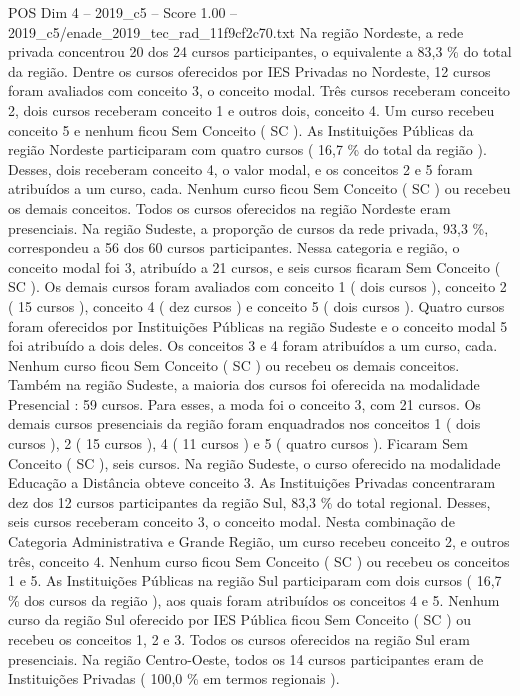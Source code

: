 \begin{textsample}{POS Dim 4 – 2019\_c5 – Score 1.00 – 2019\_c5/enade\_2019\_tec\_rad\_11f9cf2c70.txt}
Na região Nordeste, a rede privada concentrou 20 dos 24 cursos participantes, o equivalente a 83,3 \% do total da região.
Dentre os cursos oferecidos por IES Privadas no Nordeste, 12 cursos foram avaliados com conceito 3, o conceito modal.
Três cursos receberam conceito 2, dois cursos receberam conceito 1 e outros dois, conceito 4.
Um curso recebeu conceito 5 e nenhum ficou Sem Conceito ( SC ).
As Instituições Públicas da região Nordeste participaram com quatro cursos ( 16,7 \% do total da região ).
Desses, dois receberam conceito 4, o valor modal, e os conceitos 2 e 5 foram atribuídos a um curso, cada.
Nenhum curso ficou Sem Conceito ( SC ) ou recebeu os demais conceitos.
Todos os cursos oferecidos na região Nordeste eram presenciais.
Na região Sudeste, a proporção de cursos da rede privada, 93,3 \%, correspondeu a 56 dos 60 cursos participantes.
Nessa categoria e região, o conceito modal foi 3, atribuído a 21 cursos, e seis cursos ficaram Sem Conceito ( SC ).
Os demais cursos foram avaliados com conceito 1 ( dois cursos ), conceito 2 ( 15 cursos ), conceito 4 ( dez cursos ) e conceito 5 ( dois cursos ).
Quatro cursos foram oferecidos por Instituições Públicas na região Sudeste e o conceito modal 5 foi atribuído a dois deles.
Os conceitos 3 e 4 foram atribuídos a um curso, cada.
Nenhum curso ficou Sem Conceito ( SC ) ou recebeu os demais conceitos.
Também na região Sudeste, a maioria dos cursos foi oferecida na modalidade Presencial : 59 cursos.
Para esses, a moda foi o conceito 3, com 21 cursos.
Os demais cursos presenciais da região foram enquadrados nos conceitos 1 ( dois cursos ), 2 ( 15 cursos ), 4 ( 11 cursos ) e 5 ( quatro cursos ).
Ficaram Sem Conceito ( SC ), seis cursos.
Na região Sudeste, o curso oferecido na modalidade Educação a Distância obteve conceito 3.
As Instituições Privadas concentraram dez dos 12 cursos participantes da região Sul, 83,3 \% do total regional.
Desses, seis cursos receberam conceito 3, o conceito modal.
Nesta combinação de Categoria Administrativa e Grande Região, um curso recebeu conceito 2, e outros três, conceito 4.
Nenhum curso ficou Sem Conceito ( SC ) ou recebeu os conceitos 1 e 5.
As Instituições Públicas na região Sul participaram com dois cursos ( 16,7 \% dos cursos da região ), aos quais foram atribuídos os conceitos 4 e 5.
Nenhum curso da região Sul oferecido por IES Pública ficou Sem Conceito ( SC ) ou recebeu os conceitos 1, 2 e 3.
Todos os cursos oferecidos na região Sul eram presenciais.
Na região Centro-Oeste, todos os 14 cursos participantes eram de Instituições Privadas ( 100,0 \% em termos regionais ).

\end{textsample}
